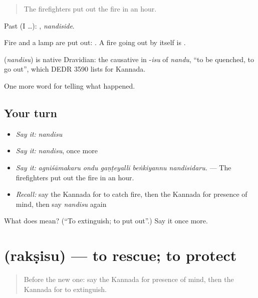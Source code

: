 \begin{quote}
The firefighters put out the fire in an hour.
\end{quote}

Past (I …): , \emph{nandiside}.

Fire and a lamp are put out:  . A fire going out by itself is .

\begin{cousinweb}
\textbf{} (\emph{nandisu}) is native Dravidian: the causative in -\emph{isu} of \emph{nandu}, \textquotedblleft{}to be quenched, to go out\textquotedblright{}, which DEDR 3590 lists for Kannada.
\end{cousinweb}

\begin{grammarlens}[title={What you've built}]
One more word for telling what happened.
\end{grammarlens}

\subsection*{Your turn}
\begin{itemize}
\raggedright
  \item \emph{Say it:} \emph{nandisu}
  \item \emph{Say it:} \emph{nandisu}, once more
  \item \emph{Say it:} \emph{agniśāmakaru ondu gaṇṭeyalli beṅkiyannu nandisidaru.} — The firefighters put out the fire in an hour.
  \item \emph{Recall:} say the Kannada for to catch fire, then the Kannada for presence of mind, then say \emph{nandisu} again
\end{itemize}

\begin{tcolorbox}[breakable,colback=teal!4,colframe=teal!35!black,title={Before you move on}]
What does  mean? (\textquotedblleft{}To extinguish; to put out\textquotedblright{}.) Say it once more.
\end{tcolorbox}
\section[\texorpdfstring{\kn{ರಕ್ಷಿಸು} (rakṣisu)}{ರಕ್ಷಿಸು (rakṣisu)}]{ (rakṣisu) — to rescue; to protect}

\label{lesson:KA-C324-raksisu}



\begin{quote}
Before the new one: say the Kannada for presence of mind, then the Kannada for to extinguish.
\end{quote}

